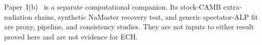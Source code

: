 \documentclass[aps,prd,twocolumn,superscriptaddress,showpacs,preprintnumbers,nofootinbib,longbibliography,floatfix]{revtex4-2}
\newcommand{\fnl}{f_{\rm NL}}
\begin{document}
Paper~I(b)~\cite{Golden2026P1b} is a separate computational companion.  Its
stock-CAMB extra-radiation chains, synthetic NaMaster recovery test, and
generic spectator-ALP fit are proxy, pipeline, and consistency studies.  They
are not inputs to either result proved here and are not evidence for ECH.

\end{document}
